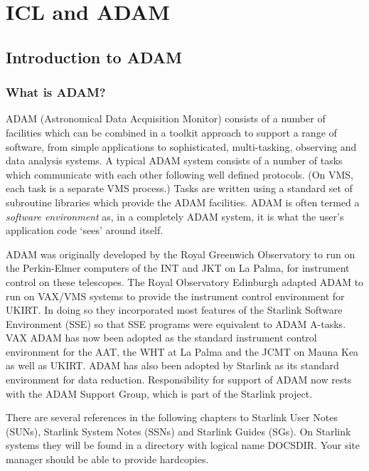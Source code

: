 \documentclass[twoside,11pt,nolof,chapters]{starlink}
\begin{document}
\cleardoublepage
\part{ICL and ADAM}
   

\chapter{Introduction to ADAM}

\section{What is ADAM?}

ADAM (Astronomical Data Acquisition Monitor) consists of a number of facilities
which can be combined in a toolkit approach to support a range of software,
from simple applications to sophisticated, multi-tasking, observing and data
analysis systems.
A typical ADAM system consists of a number of tasks which communicate with each
other following well defined protocols.
(On VMS, each task is a separate VMS process.)
Tasks are written using a standard set of subroutine libraries which provide
the ADAM facilities.
ADAM is often termed a \emph{software environment} as, in a completely ADAM
system, it is what the user's application code `sees' around itself.

ADAM was originally developed by the Royal Greenwich Observatory to run on the
Perkin-Elmer computers of the INT and JKT on La Palma, for instrument
control on these telescopes. The Royal Observatory
Edinburgh adapted ADAM to run on VAX/VMS systems to provide the
instrument control environment for UKIRT. In doing so they incorporated
most features of the Starlink Software Environment (SSE) so that SSE programs
were equivalent to ADAM A-tasks. VAX ADAM has now been adopted as the
standard instrument control environment for the AAT, the WHT at La Palma
and the JCMT on Mauna Kea as well as UKIRT. ADAM has also been adopted
by Starlink as its standard environment for data reduction.
Responsibility for support of ADAM now rests with the ADAM Support Group,
which is part of the Starlink project.

There are several references in the following chapters to Starlink User Notes
(SUNs), Starlink System Notes (SSNs) and Starlink Guides (SGs).
On Starlink systems they will be found in a directory with logical name
DOCSDIR. Your site manager should be able to provide hardcopies.
\end{document}
